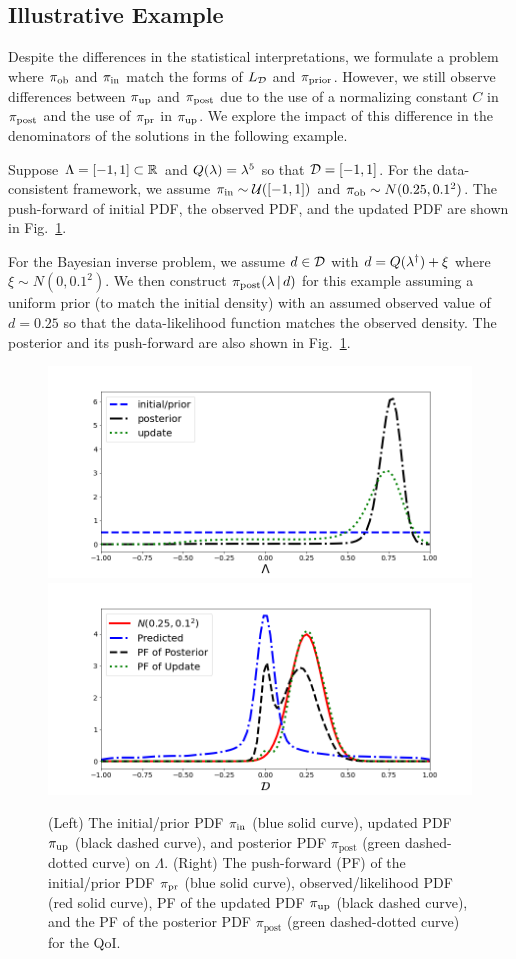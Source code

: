 \subsection{Illustrative Example}
Despite the differences in the statistical interpretations, we formulate a problem where $\operatorname*{\pi_{ob}}$ and $\operatorname*{\pi_{in}}$ match the forms of $L_{\mathcal{D}}$ and $\operatorname*{\pi_{prior}}$.
However, we still observe differences between $\operatorname*{\pi_{up}}$ and $\operatorname*{\pi_{post}}$ due to the use of a normalizing constant $C$ in $\operatorname*{\pi_{post}}$ and the use of $\operatorname*{\pi_{pr}}$ in $\operatorname*{\pi_{up}}$.
We explore the impact of this difference in the denominators of the solutions in the following example.



\begin{ex}
Suppose ${\Lambda} = [-1,1]\subset\mathbb{R}$ and $Q(\lambda)=\lambda^5$ so that $\mathcal{D} = [-1,1]$.
For the data-consistent framework, we assume $\operatorname*{\pi_{in}}\sim \mathcal{U}([-1,1])$ and $\operatorname*{\pi_{ob}}\sim N(0.25,0.1^2)$.
The push-forward of initial PDF, the observed PDF, and the updated PDF are shown in Fig.~\ref{fig:bayes-comparison}.

For the Bayesian inverse problem, we assume $d\in \mathcal{D}$ with $d=Q(\lambda^\dagger)+\xi$ where $\xi\sim N(0,0.1^2)$.
We then construct $\pi_{\text{post}}(\lambda \, |\, d)$ for this example assuming a uniform prior (to match the initial density) with an assumed observed value of $d=0.25$ so that the data-likelihood function matches the observed density.
The posterior and its push-forward are also shown in Fig.~\ref{fig:bayes-comparison}.


\begin{figure}[htbp]
\centering
   \includegraphics[width=0.49\linewidth]{figures/bip-vs-sip-1.png}
   \includegraphics[width=0.49\linewidth]{figures/bip-vs-sip-pf-1.png}
 \caption{(Left) The initial/prior PDF $\operatorname*{\pi_{in}}$ (blue solid curve), updated PDF $\operatorname*{\pi_{up}}$ (black dashed curve), and posterior PDF $\pi_\text{post}$ (green dashed-dotted curve) on $\Lambda$.
 (Right) The push-forward (PF) of the initial/prior PDF $\operatorname*{\pi_{pr}}$ (blue solid curve), observed/likelihood PDF (red solid curve), PF of the updated PDF $\operatorname*{\pi_{up}}$ (black dashed curve), and the PF of the posterior PDF $\pi_\text{post}$ (green dashed-dotted curve) for the QoI.}
 \label{fig:bayes-comparison}
\end{figure}



\end{ex}
